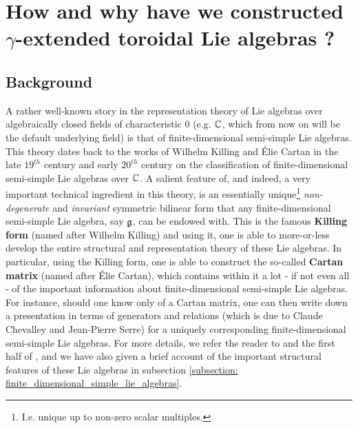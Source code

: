 \section{How and why have we constructed \texorpdfstring{$\gamma$}{}-extended toroidal Lie algebras ?}
    \subsection{Background}
        A rather well-known story in the representation theory of Lie algebras over algebraically closed fields of characteristic $0$ (e.g. $\mathbb{C}$, which from now on will be the default underlying field) is that of finite-dimensional semi-simple Lie algebras. This theory dates back to the works of Wilhelm Killing and \'Elie Cartan in the late $19^{th}$ century and early $20^{th}$ century on the classification of finite-dimensional semi-simple Lie algebras over $\mathbb{C}$. A salient feature of, and indeed, a very important technical ingredient in this theory, is an essentially unique\footnote{I.e. unique up to non-zero scalar multiples.} \textit{non-degenerate} and \textit{invariant} symmetric bilinear form that any finite-dimensional semi-simple Lie algebra, say $\mathfrak{g}$, can be endowed with. This is the famous \textbf{Killing form} (named after Wilhelm Killing) and using it, one is able to more-or-less develop the entire structural and representation theory of these Lie algebras. In particular, using the Killing form, one is able to construct the so-called \textbf{Cartan matrix} (named after \'Elie Cartan), which contains within it a lot - if not even all - of the important information about finite-dimensional semi-simple Lie algebras. For instance, should one know only of a Cartan matrix, one can then write down a presentation in terms of generators and relations (which is due to Claude Chevalley and Jean-Pierre Serre) for a uniquely corresponding finite-dimensional semi-simple Lie algebras. For more details, we refer the reader to \cite{humphreys_lie_algebras} and the first half of \cite{carter_affine_lie_algebras}, and we have also given a brief account of the important structural features of these Lie algebras in subsection \ref{subsection: finite_dimensional_simple_lie_algebras}.

